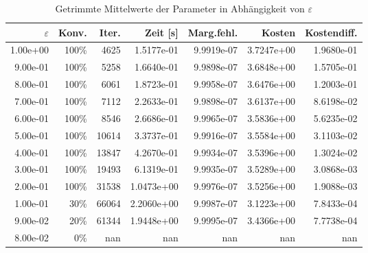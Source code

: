 \begin{table}[htbp]
\caption{Getrimmte Mittelwerte der Parameter in Abhängigkeit von $\varepsilon$}
\label{tab:Parametertest256_tol1e-06}
\small
\centering
{}
\begin{tabular}{rrrrrrr}
\toprule
$\varepsilon$ & Konv. & Iter. & Zeit [s] & Marg.fehl. & Kosten & Kostendiff. \\
\midrule
1.00e+00 & 100\% & 4625 & 1.5177e-01 & 9.9919e-07 & 3.7247e+00 & 1.9680e-01 \\
9.00e-01 & 100\% & 5258 & 1.6640e-01 & 9.9898e-07 & 3.6848e+00 & 1.5705e-01 \\
8.00e-01 & 100\% & 6061 & 1.8723e-01 & 9.9958e-07 & 3.6476e+00 & 1.2003e-01 \\
7.00e-01 & 100\% & 7112 & 2.2633e-01 & 9.9898e-07 & 3.6137e+00 & 8.6198e-02 \\
6.00e-01 & 100\% & 8546 & 2.6686e-01 & 9.9965e-07 & 3.5836e+00 & 5.6235e-02 \\
5.00e-01 & 100\% & 10614 & 3.3737e-01 & 9.9916e-07 & 3.5584e+00 & 3.1103e-02 \\
4.00e-01 & 100\% & 13847 & 4.2670e-01 & 9.9934e-07 & 3.5396e+00 & 1.3024e-02 \\
3.00e-01 & 100\% & 19493 & 6.1319e-01 & 9.9935e-07 & 3.5289e+00 & 3.0868e-03 \\
2.00e-01 & 100\% & 31538 & 1.0473e+00 & 9.9976e-07 & 3.5256e+00 & 1.9088e-03 \\
1.00e-01 & 30\% & 66064 & 2.2060e+00 & 9.9987e-07 & 3.1223e+00 & 7.8433e-04 \\
9.00e-02 & 20\% & 61344 & 1.9448e+00 & 9.9995e-07 & 3.4366e+00 & 7.7738e-04 \\
8.00e-02 & 0\% & nan & nan & nan & nan & nan \\
\bottomrule
\end{tabular}
\end{table}
